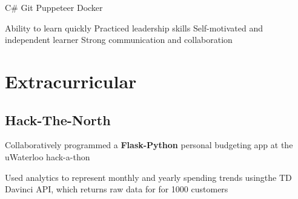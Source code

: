 \documentclass[letterpaper]{deedy-resume} %
\begin{document}
\begin{minipage}[t]{0.33\textwidth}
 
\newline
   \textbullet{} C\# 
   \textbullet{} Git
   \textbullet{} Puppeteer
    \textbullet{} Docker
   \vspace{5pt}
   
    \textbullet{} Ability to learn quickly \newline
    \textbullet{} Practiced leadership skills \newline
    \textbullet{} Self-motivated and independent learner \newline
    \textbullet{} Strong communication and collaboration
    \newline
     
    



\sectionspace
\section{Extracurricular}



\subsection{Hack-The-North}
\begin{tightitemize}

\sectionspace{}
\item Collaboratively programmed a \textbf{Flask-Python} personal budgeting app at the uWaterloo hack-a-thon
\item Used analytics to represent monthly and yearly spending trends using\newline  the TD Davinci API, which returns raw data for for 1000 customers
\end{tightitemize}

\end{minipage}
\end{document}

